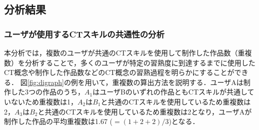 \documentclass[submit]{ipsj}
\begin{document}


\vspace{-2mm}
\subsection{分析結果}\label{sec:3-analysis}

\subsubsection{ユーザが使用するCTスキルの共通性の分析}\label{subsec:path-analysis}

本分析では，複数のユーザが共通のCTスキルを使用して制作した作品数（重複数）を分析することで，多くのユーザが特定の習熟度に到達するまでに使用したCT概念や制作した作品数などのCT概念の習熟過程を明らかにすることができる．%
図\ref{fig:digraph}の例を用いて，\textcolor{red}{}重複数の算出方法を説明する．ユーザAは制作した3つの作品のうち，$A_1$はユーザBのいずれの作品ともCTスキルが共通していないため重複数は1，$A_2$は$B_1$と共通のCTスキルを使用しているため重複数は2，$A_3$は$B_2$と共通のCTスキルを使用しているため重複数は2となり，ユーザAが制作した作品の\textcolor{red}{}平均重複数は1.67 ($=(1 + 2 + 2) / 3$)となる．
\end{document}
